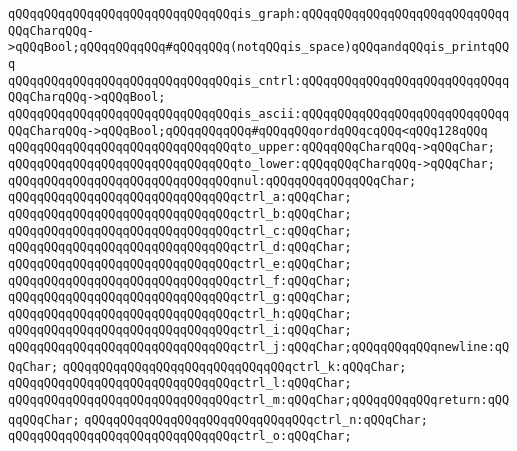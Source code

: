 \verb|qQQqqQQqqQQqqQQqqQQqqQQqqQQqqQQqis_graph:qQQqqQQqqQQqqQQqqQQqqQQqqQQqqQQqCharqQQq->qQQqBool;qQQqqQQqqQQq#qQQqqQQq(notqQQqis_space)qQQqandqQQqis_printqQQq|\newline
\verb|qQQqqQQqqQQqqQQqqQQqqQQqqQQqqQQqis_cntrl:qQQqqQQqqQQqqQQqqQQqqQQqqQQqqQQqCharqQQq->qQQqBool;|\newline
\verb|qQQqqQQqqQQqqQQqqQQqqQQqqQQqqQQqis_ascii:qQQqqQQqqQQqqQQqqQQqqQQqqQQqqQQqCharqQQq->qQQqBool;qQQqqQQqqQQq#qQQqqQQqordqQQqcqQQq<qQQq128qQQq|\newline
\newline
\verb|qQQqqQQqqQQqqQQqqQQqqQQqqQQqqQQqto_upper:qQQqqQQqCharqQQq->qQQqChar;|\newline
\verb|qQQqqQQqqQQqqQQqqQQqqQQqqQQqqQQqto_lower:qQQqqQQqCharqQQq->qQQqChar;|\newline
\newline
\verb|qQQqqQQqqQQqqQQqqQQqqQQqqQQqqQQqnul:qQQqqQQqqQQqqQQqChar;|\newline
\verb|qQQqqQQqqQQqqQQqqQQqqQQqqQQqqQQqctrl_a:qQQqChar;|\newline
\verb|qQQqqQQqqQQqqQQqqQQqqQQqqQQqqQQqctrl_b:qQQqChar;|\newline
\verb|qQQqqQQqqQQqqQQqqQQqqQQqqQQqqQQqctrl_c:qQQqChar;|\newline
\verb|qQQqqQQqqQQqqQQqqQQqqQQqqQQqqQQqctrl_d:qQQqChar;|\newline
\verb|qQQqqQQqqQQqqQQqqQQqqQQqqQQqqQQqctrl_e:qQQqChar;|\newline
\verb|qQQqqQQqqQQqqQQqqQQqqQQqqQQqqQQqctrl_f:qQQqChar;|\newline
\verb|qQQqqQQqqQQqqQQqqQQqqQQqqQQqqQQqctrl_g:qQQqChar;|\newline
\verb|qQQqqQQqqQQqqQQqqQQqqQQqqQQqqQQqctrl_h:qQQqChar;|\newline
\verb|qQQqqQQqqQQqqQQqqQQqqQQqqQQqqQQqctrl_i:qQQqChar;|\newline
\verb|qQQqqQQqqQQqqQQqqQQqqQQqqQQqqQQqctrl_j:qQQqChar;qQQqqQQqqQQqnewline:qQQqChar;|\newline
\verb|qQQqqQQqqQQqqQQqqQQqqQQqqQQqqQQqctrl_k:qQQqChar;|\newline
\verb|qQQqqQQqqQQqqQQqqQQqqQQqqQQqqQQqctrl_l:qQQqChar;|\newline
\verb|qQQqqQQqqQQqqQQqqQQqqQQqqQQqqQQqctrl_m:qQQqChar;qQQqqQQqqQQqreturn:qQQqqQQqChar;|\newline
\verb|qQQqqQQqqQQqqQQqqQQqqQQqqQQqqQQqctrl_n:qQQqChar;|\newline
\verb|qQQqqQQqqQQqqQQqqQQqqQQqqQQqqQQqctrl_o:qQQqChar;|\newline
